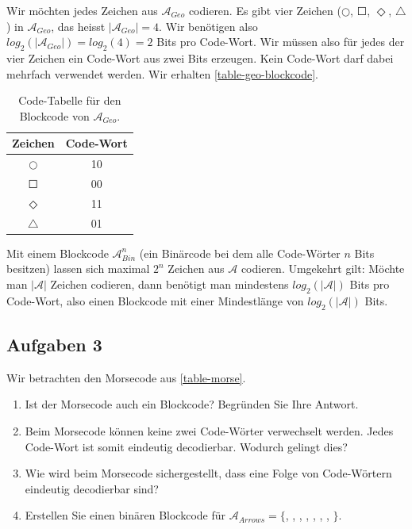 \begin{table}[htb]
\centering
\begin{minipage}{0.6\textwidth}
\begin{example}
Wir möchten jedes Zeichen aus $\mathscr{A}_{Geo}$ codieren. Es gibt vier Zeichen ($\Circle$, $\Square$, $\Diamond$, $\triangle$) in $\mathscr{A}_{Geo}$, das heisst $|\mathscr{A}_{Geo}| = 4$. Wir benötigen also  $log_2(|\mathscr{A}_{Geo}|)=log_2(4)=2$ Bits pro Code-Wort. Wir müssen also für jedes der vier Zeichen ein Code-Wort aus zwei Bits erzeugen. Kein Code-Wort darf dabei mehrfach verwendet werden. Wir erhalten \autoref{table-geo-blockcode}.
\end{example}
\end{minipage}
\hfill
\begin{minipage}{0.35\textwidth}
\centering
\begin{tabular}{|c|c|}
\hline
Zeichen & Code-Wort \\ \hline
 $\Circle$       & 10         \\ \hline
 $\Square$       & 00        \\ \hline
 $\Diamond$       & 11         \\ \hline
 $\triangle$       & 01        \\ \hline
\end{tabular}
\caption{Code-Tabelle für den Blockcode von $\mathscr{A}_{Geo}$.}
\label{table-geo-blockcode}	
\end{minipage}
\end{table}

\begin{important}
Mit einem Blockcode $\mathscr{A}^n_{Bin}$ (ein Binärcode bei dem alle Code-Wörter $n$ Bits besitzen) lassen sich maximal $2^n$ Zeichen aus $\mathscr{A}$ codieren. Umgekehrt gilt: Möchte man $|\mathscr{A}|$ Zeichen codieren, dann benötigt man mindestens $log_2(|\mathscr{A}|)$ Bits pro Code-Wort, also einen Blockcode mit einer Mindestlänge von $log_2(|\mathscr{A}|)$ Bits.
\end{important}

\subsection{Aufgaben 3}

Wir betrachten den Morsecode aus \autoref{table-morse}.

\begin{enumerate}
\item Ist der Morsecode auch ein Blockcode? Begründen Sie Ihre Antwort.
\item Beim Morsecode können keine zwei Code-Wörter verwechselt werden. Jedes Code-Wort ist somit eindeutig decodierbar. Wodurch gelingt dies?
\item Wie wird beim Morsecode sichergestellt, dass eine Folge von Code-Wörtern eindeutig decodierbar sind?
\item Erstellen Sie einen binären Blockcode für $\mathscr{A}_{Arrows} = \{$\faAngleDoubleDown, \faAngleDoubleLeft, \faAngleDoubleRight, \faAngleDoubleUp, \faAngleDown, \faAngleLeft, \faAngleRight, \faAngleUp $\}$.
\end{enumerate}

